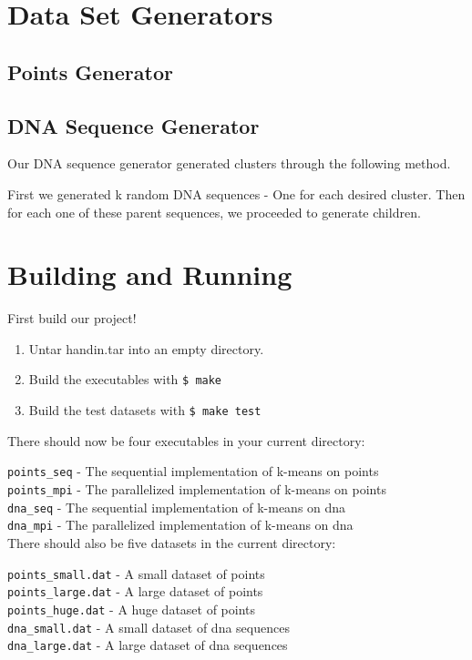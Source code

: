 \documentclass[12pt]{article}
\begin{document}
\section{Data Set Generators}

\subsection{Points Generator}

\subsection{DNA Sequence Generator}

Our DNA sequence generator generated clusters through the following method.

First we generated k random DNA sequences - One for each desired cluster. Then for each one of these parent sequences, we proceeded to generate children.

\section{Building and Running}

First build our project!

\begin{enumerate}
\item Untar handin.tar into an empty directory.
\item Build the executables with \texttt{\$ make}
\item Build the test datasets with \texttt{\$ make test}
\end{enumerate}

There should now be four executables in your current directory: 


\texttt{points\_seq} - The sequential implementation of k-means on points \\
\texttt{points\_mpi} - The parallelized implementation of k-means on points \\
\texttt{dna\_seq} - The sequential implementation of k-means on dna \\
\texttt{dna\_mpi} - The parallelized implementation of k-means on dna \\

There should also be five datasets in the current directory:


\texttt{points\_small.dat} - A small dataset of points \\
\texttt{points\_large.dat} - A large dataset of points \\
\texttt{points\_huge.dat} - A huge dataset of points \\
\texttt{dna\_small.dat} - A small dataset of dna sequences \\
\texttt{dna\_large.dat} - A large dataset of dna sequences \\
\end{document}
